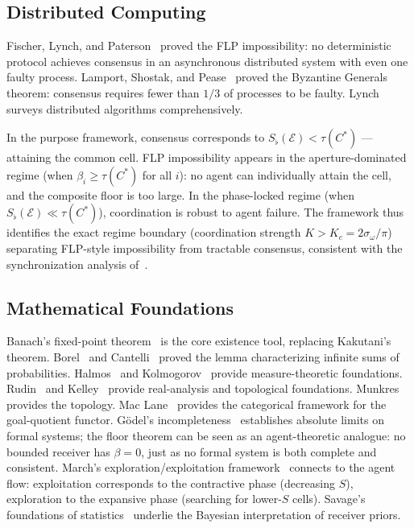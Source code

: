 \documentclass[twocolumn,11pt,a4paper]{article}
\theoremstyle{remark}
\newcommand{\Sflat}{S_{\flat}}
\newcommand{\tol}{\tau}
\newcommand{\Ens}{\mathcal{E}}            %
\begin{document}
\subsection{Distributed Computing}
\label{sec:lit:dist}

Fischer, Lynch, and Paterson~\cite{flp1985} proved the FLP impossibility:
no deterministic protocol achieves consensus in an asynchronous distributed
system with even one faulty process.  Lamport, Shostak, and Pease~\cite{lamport1982}
proved the Byzantine Generals theorem: consensus requires fewer than $1/3$
of processes to be faulty.  Lynch~\cite{lynch1996} surveys distributed
algorithms comprehensively.

In the purpose framework, consensus corresponds to $\Sflat(\Ens) < \tol(C^*)$
— attaining the common cell.  FLP impossibility appears in the
aperture-dominated regime (when $\beta_i \ge \tol(C^*)$ for all $i$):
no agent can individually attain the cell, and the composite floor is too
large.  In the phase-locked regime (when $\Sflat(\Ens) \ll \tol(C^*)$),
coordination is robust to agent failure.  The framework thus identifies
the exact regime boundary (coordination strength $K > K_c = 2\sigma_\omega/\pi$)
separating FLP-style impossibility from tractable consensus, consistent
with the synchronization analysis of~\cite{sachikonye2025agents}.

\subsection{Mathematical Foundations}
\label{sec:lit:math}

Banach's fixed-point theorem~\cite{banach1922} is the core existence
tool, replacing Kakutani's theorem.  Borel~\cite{borel1909} and
Cantelli~\cite{cantelli1917} proved the lemma characterizing infinite
sums of probabilities.  Halmos~\cite{halmos1950} and Kolmogorov~\cite{kolmogorov1933}
provide measure-theoretic foundations.  Rudin~\cite{rudin1976} and
Kelley~\cite{kelley1955} provide real-analysis and topological foundations.
Munkres~\cite{munkres2000} provides the topology.  Mac Lane~\cite{maclane1998}
provides the categorical framework for the goal-quotient functor.
G\"odel's incompleteness~\cite{godel1931} establishes absolute limits on
formal systems; the floor theorem can be seen as an agent-theoretic
analogue: no bounded receiver has $\beta = 0$, just as no formal system
is both complete and consistent.
March's exploration/exploitation framework~\cite{march1991} connects to the
agent flow: exploitation corresponds to the contractive phase (decreasing
$S$), exploration to the expansive phase (searching for lower-$S$ cells).
Savage's foundations of statistics~\cite{savage1954} underlie the
Bayesian interpretation of receiver priors.
\end{document}
